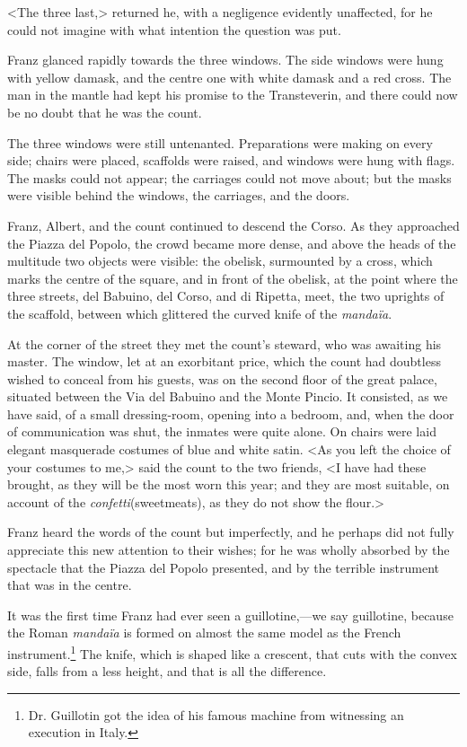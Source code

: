  <The three last,> returned he, with a negligence evidently unaffected, for he could not imagine with what intention the question was put. 

 Franz glanced rapidly towards the three windows. The side windows were hung with yellow damask, and the centre one with white damask and a red cross. The man in the mantle had kept his promise to the Transteverin, and there could now be no doubt that he was the count. 

 The three windows were still untenanted. Preparations were making on every side; chairs were placed, scaffolds were raised, and windows were hung with flags. The masks could not appear; the carriages could not move about; but the masks were visible behind the windows, the carriages, and the doors. 

 Franz, Albert, and the count continued to descend the Corso. As they approached the Piazza del Popolo, the crowd became more dense, and above the heads of the multitude two objects were visible: the obelisk, surmounted by a cross, which marks the centre of the square, and in front of the obelisk, at the point where the three streets, del Babuino, del Corso, and di Ripetta, meet, the two uprights of the scaffold, between which glittered the curved knife of the \textit{mandaïa}. 

 At the corner of the street they met the count's steward, who was awaiting his master. The window, let at an exorbitant price, which the count had doubtless wished to conceal from his guests, was on the second floor of the great palace, situated between the Via del Babuino and the Monte Pincio. It consisted, as we have said, of a small dressing-room, opening into a bedroom, and, when the door of communication was shut, the inmates were quite alone. On chairs were laid elegant masquerade costumes of blue and white satin.  <As you left the choice of your costumes to me,> said the count to the two friends, <I have had these brought, as they will be the most worn this year; and they are most suitable, on account of the \textit{confetti}(sweetmeats), as they do not show the flour.> 

 Franz heard the words of the count but imperfectly, and he perhaps did not fully appreciate this new attention to their wishes; for he was wholly absorbed by the spectacle that the Piazza del Popolo presented, and by the terrible instrument that was in the centre. 

 It was the first time Franz had ever seen a guillotine,—we say guillotine, because the Roman \textit{mandaïa} is formed on almost the same model as the French instrument.\footnote{Dr. Guillotin got the idea of his famous machine from witnessing an execution in Italy.} The knife, which is shaped like a crescent, that cuts with the convex side, falls from a less height, and that is all the difference. 

